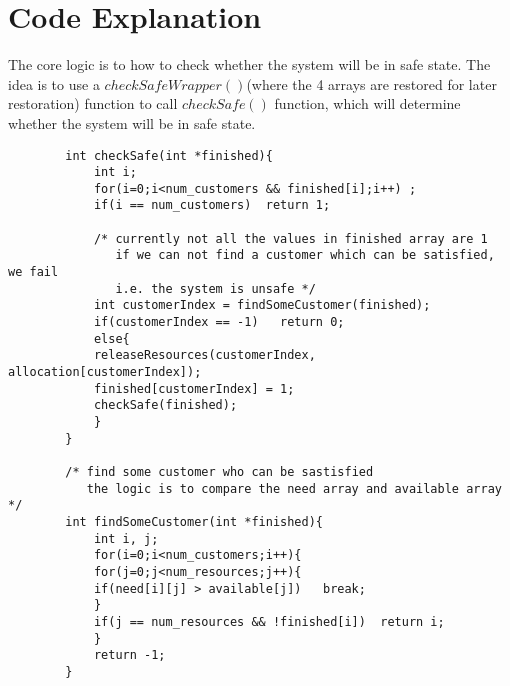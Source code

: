\documentclass[12pt]{extarticle}
\newcommand{\<}{\langle}
\renewcommand{\>}{\rangle}
\theoremstyle{definition}
\begin{document}
	\section{Code Explanation}
	The core logic is to how to check whether the system will be in safe state. The idea is to use a $checkSafeWrapper()$(where the 4 arrays are restored for later restoration) function to call $checkSafe()$ function, which will determine whether the system will be in safe state.
	\begin{lstlisting}
		int checkSafe(int *finished){
			int i;
			for(i=0;i<num_customers && finished[i];i++) ;
			if(i == num_customers)  return 1;
			
			/* currently not all the values in finished array are 1 
			   if we can not find a customer which can be satisfied, we fail
			   i.e. the system is unsafe */
			int customerIndex = findSomeCustomer(finished);
			if(customerIndex == -1)   return 0;
			else{
			releaseResources(customerIndex, allocation[customerIndex]);
			finished[customerIndex] = 1;
			checkSafe(finished);
			}
		}
		
		/* find some customer who can be sastisfied
		   the logic is to compare the need array and available array */
		int findSomeCustomer(int *finished){
			int i, j;
			for(i=0;i<num_customers;i++){
			for(j=0;j<num_resources;j++){
			if(need[i][j] > available[j])   break;
			}
			if(j == num_resources && !finished[i])  return i;
			}
			return -1;
		}
	\end{lstlisting}
\end{document}
